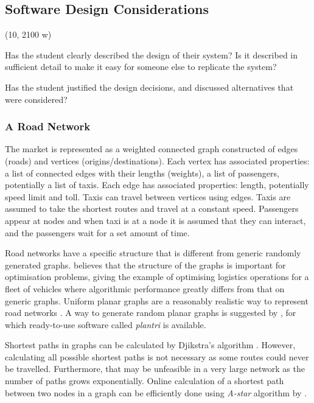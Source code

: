 \subsection{Software Design Considerations}

(10, 2100 w)

Has the student clearly described the design of their system? Is it described
in sufficient detail to make it easy for someone else to replicate the system?

Has the student justified the design decisions, and discussed alternatives that
were considered?


\subsubsection{A Road Network}
\label{sec:design:network}

The market is represented as a weighted connected graph constructed of edges
(roads) and vertices (origins/destinations). Each vertex has associated
properties: a list of connected edges with their lengths (weights), a list of
passengers, potentially a list of taxis. Each edge has associated properties:
length, potentially speed limit and toll. Taxis can travel between vertices
using edges. Taxis are assumed to take the shortest routes and travel at a
constant speed. Passengers appear at nodes and when taxi is at a node it is
assumed that they can interact, and the passengers wait for a set amount of
time.

Road networks have a specific structure that is different from generic randomly
generated graphs. \textcite{Eisenstat2011graphs+quadtree} believes that the
structure of the graphs is important for optimisation problems, giving the
example of optimising logistics operations for a fleet of vehicles where
algorithmic performance greatly differs from that on generic graphs. Uniform
planar graphs are a reasonably realistic way to represent road networks
\parencite{Eisenstat2011graphs+quadtree, Masucci2009graphs+london}. A way to
generate random planar graphs is suggested by
\textcite{Brinkmann2007graphs+generate}, for which ready-to-use software called
\textit{plantri} is available. 

Shortest paths in graphs can be calculated by Djikstra's algorithm
\parencite{Cormen2009algorithms}. However, calculating all possible shortest
paths is not necessary as some routes could never be travelled. Furthermore,
that may be unfeasible in a very large network as the number of paths grows
exponentially. Online calculation of a shortest path between two nodes in a
graph can be efficiently done using \textit{A-star} algorithm by
\textcite{Hart1968paths}.


